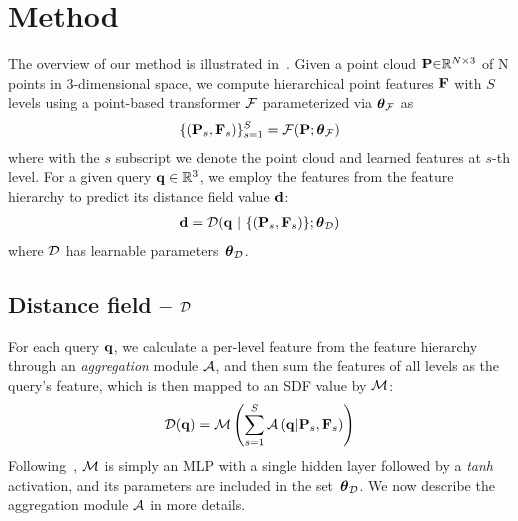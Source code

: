 \section{Method}
\label{sec:formatting}
The overview of our method is illustrated in~. 
Given a point cloud $\mathbf{P} {\in} \mathbb{R}^{N\times 3}$ of N points in 3-dimensional space, we compute hierarchical point features $\mathbf{F}$ with $S$ levels using a point-based transformer $\mathcal{F}$ parameterized via $\boldsymbol{\theta}_{\mathcal{F}}$ as
\begin{align}
\{(\mathbf{P}_s, \mathbf{F}_s)\}^{S}_{s=1} = \mathcal{F}(\mathbf{P}; \boldsymbol{\theta}_{\mathcal{F}})
\end{align}
where with the $s$ subscript we denote the point cloud and learned features at $s$-th level.  
For a given query $\mathbf{q} \in \mathbb{R}^{3}$, we employ the features from the feature hierarchy to predict its distance field value $\mathbf{d}$:
\begin{align}
\mathbf{d} = \mathcal{D}(\mathbf{q} ~|~ \{(\mathbf{P}_s, \mathbf{F}_s )\} ; \boldsymbol{\theta}_{\mathcal{D}})
\end{align}
where $\mathcal{D}$ has learnable parameters~$\boldsymbol{\theta}_{\mathcal{D}}$.

\subsection{Distance field\texorpdfstring{ -- $\mathcal{D}$}{}}
For each query $\mathbf{q}$, we calculate a per-level feature from the feature hierarchy through an \textit{aggregation} module $\mathcal{A}$, and then sum the features of all levels as the query's feature, which is then mapped to an SDF value by $\mathcal{M}$:
\begin{align}
\mathcal{D}(\mathbf{q}) = \mathcal{M}\left(\sum_{s=1}^{S} \mathcal{A}\left(\mathbf{q}| \mathbf{P}_s, \mathbf{F}_s\right) \right)
\end{align}
Following~\citet{huang2023neural}, $\mathcal{M}$ is simply an MLP with a single hidden layer followed by a \textit{tanh} activation, and its parameters are included in the set~$\boldsymbol{\theta}_{\mathcal{D}}$. 
We now describe the aggregation module $\mathcal{A}$ in more details.

